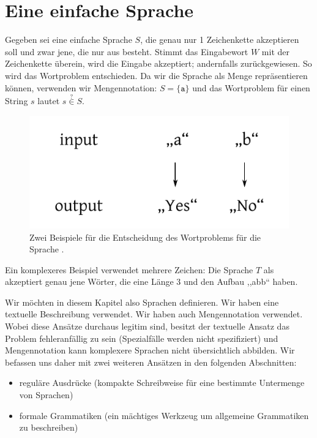 \section{Eine einfache Sprache}
%
Gegeben sei eine einfache Sprache $S$, die genau nur 1 Zeichenkette akzeptieren soll und zwar jene, die nur aus  besteht. Stimmt das Eingabewort $W$ mit der Zeichenkette  überein, wird die Eingabe akzeptiert; andernfalls zurückgewiesen. So wird das Wortproblem entschieden. Da wir die Sprache als Menge repräsentieren können, verwenden wir Mengennotation: $S = \{\texttt{a}\}$ und das Wortproblem für einen String $s$ lautet $s \stackrel{?}{\in} S$.
%
\begin{figure}[ht]
 \begin{center}
  \includegraphics{img/wordproblem.pdf}
  \caption{Zwei Beispiele für die Entscheidung des Wortproblems für die Sprache .}
  \label{fig:wordproblem}
 \end{center}
\end{figure}

Ein komplexeres Beispiel verwendet mehrere Zeichen: Die Sprache $T$ als  akzeptiert genau jene Wörter, die eine Länge 3 und den Aufbau ,,abb`` haben.

Wir möchten in diesem Kapitel also Sprachen definieren. Wir haben eine textuelle Beschreibung verwendet. Wir haben auch Mengennotation verwendet. Wobei diese Ansätze durchaus legitim sind, besitzt der textuelle Ansatz das Problem fehleranfällig zu sein (Spezialfälle werden nicht spezifiziert) und Mengennotation kann komplexere Sprachen nicht übersichtlich abbilden. Wir befassen uns daher mit zwei weiteren Ansätzen in den folgenden Abschnitten:
\begin{itemize}
  \item reguläre Ausdrücke (kompakte Schreibweise für eine bestimmte Untermenge von Sprachen)
  \item formale Grammatiken (ein mächtiges Werkzeug um allgemeine Grammatiken zu beschreiben)
\end{itemize}

